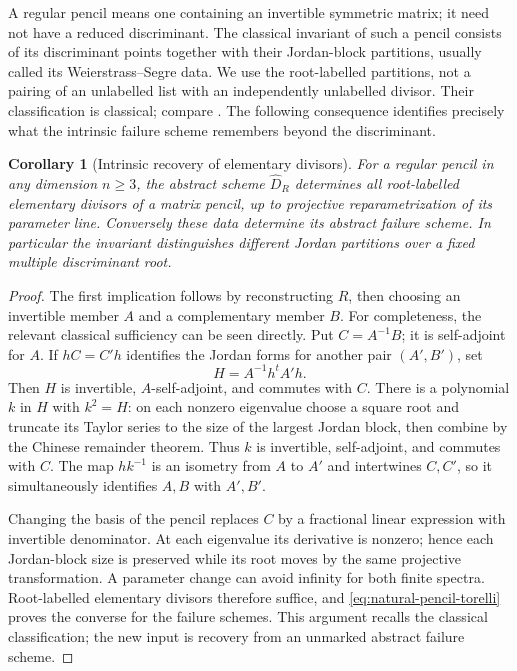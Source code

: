 \documentclass[11pt,reqno]{amsart}
\numberwithin{equation}{section}
\newtheorem{corollary}[theorem]{Corollary}
\theoremstyle{definition}\newtheorem{definition}[theorem]{Definition}
\theoremstyle{remark}\newtheorem{remark}[theorem]{Remark}
\begin{document}
A regular pencil means one containing an invertible symmetric matrix;
it need not have a reduced discriminant.  The classical invariant of
such a pencil consists of its discriminant points together with their
Jordan-block partitions, usually called its Weierstrass--Segre data.
We use the root-labelled partitions, not a pairing of an unlabelled
list with an independently unlabelled divisor.  Their classification
is classical; compare \cite[Theorem~1.1, Corollary~2.1 and \S2]{FevolaMandelshtamSturmfels}.
The following consequence identifies precisely what the intrinsic
failure scheme remembers beyond the discriminant.

\begin{corollary}[Intrinsic recovery of elementary divisors]
\label{cor:intrinsic-segre-data}
For a regular pencil in any dimension \(n\ge3\), the abstract
scheme \(\widehat D_R\) determines all root-labelled elementary
divisors of a matrix pencil, up to projective reparametrization of its
parameter line.  Conversely these data determine its abstract failure
scheme.  In particular the invariant distinguishes different Jordan
partitions over a fixed multiple discriminant root.
\end{corollary}
\begin{proof}
The first implication follows by reconstructing \(R\), then
choosing an invertible member \(A\) and a complementary member
\(B\).  For completeness, the relevant classical sufficiency can
be seen directly.  Put \(C=A^{-1}B\); it is self-adjoint for
\(A\).  If \(hC=C'h\) identifies the Jordan forms for another
pair \((A',B')\), set
\[
 H=A^{-1}h^tA'h.
\]
Then \(H\) is invertible, \(A\)-self-adjoint, and commutes with
\(C\).  There is a polynomial \(k\) in \(H\) with
\(k^2=H\): on each nonzero eigenvalue choose a square root and
truncate its Taylor series to the size of the largest Jordan block,
then combine by the Chinese remainder theorem.  Thus \(k\) is
invertible, self-adjoint, and commutes with \(C\).
The map \(hk^{-1}\) is an isometry from \(A\) to \(A'\)
and intertwines \(C,C'\), so it simultaneously identifies
\(A,B\) with \(A',B'\).

Changing the basis of the pencil replaces \(C\) by a fractional
linear expression with invertible denominator.  At each eigenvalue
its derivative is nonzero; hence each Jordan-block size is preserved
while its root moves by the same projective transformation.  A
parameter change can avoid infinity for both finite spectra.
Root-labelled elementary divisors therefore suffice, and
\eqref{eq:natural-pencil-torelli} proves the converse for the
failure schemes.  This argument recalls the classical classification;
the new input is recovery from an unmarked abstract failure scheme.
\end{proof}
\end{document}
